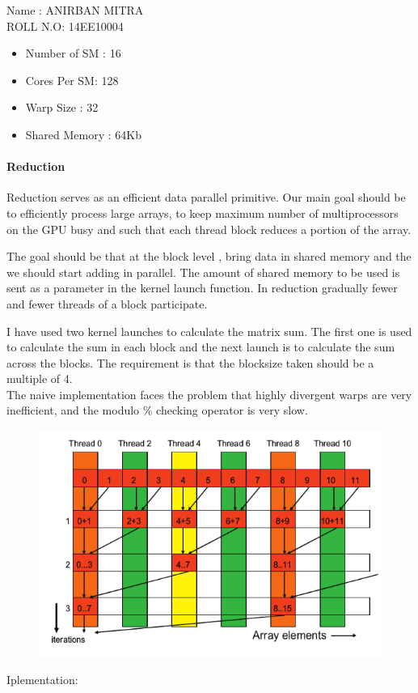 \documentclass[a4paper, 14pt]{article}
\date{\vspace{-5ex}}
\begin{document}
	\begin{center}
		Name : ANIRBAN MITRA \\
		ROLL N.O: 14EE10004
	\end{center}
	\begin{itemize}
		\item Number of SM : 16
		\item Cores Per SM: 128
		\item Warp Size : 32
		\item Shared Memory : 64Kb
	\end{itemize}
	\paragraph{Reduction}
	Reduction serves as an efficient data parallel primitive. Our main goal should be to efficiently process large arrays, to keep maximum number of multiprocessors on the GPU busy and such that each thread block reduces a portion of the array.

	The goal should be that at the block level , bring data in shared memory and the we should start adding in parallel. The amount of shared memory to be used is sent as a parameter in the kernel launch function. In reduction gradually fewer and fewer threads of a block participate.
	
	I have used two kernel launches to calculate the matrix sum. The first one is used to calculate the sum in each block and the next launch is to calculate the sum across the blocks. The requirement is that the blocksize taken should be a multiple of 4.
	\\
	The naive implementation faces the problem that highly divergent warps are very inefficient, and the modulo \% checking operator is very slow.

	\begin{figure}[h]
		\centering
		\includegraphics[scale=0.6]{naive.png}
		\label{fig:kgplogo}
	\end{figure}
	Iplementation:
		
\end{document}
